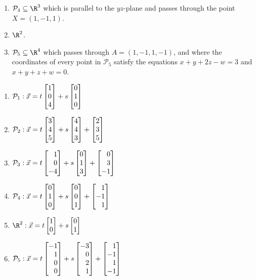 \begin{exercises}
\begin{problist}
\begin{enumerate}
			\item   $\mathcal P_4\subseteq\R^3$ which is parallel to the $yz$-plane and passes through the point $X=(1,-1,1)$.
			\item   $\R^2$.
			\item   $\mathcal P_5\subseteq\R^4$ which passes through $A=(1,-1,1,-1)$,
				and where the coordinates of every point in $\mathcal P_5$ satisfy the equations $x+y+2z-w=3$
				and $x+y+z+w=0$.
		\end{enumerate}
		\begin{solution}
			\begin{enumerate}
				\item $\mathcal{P}_1: \vec{x}=t\mat{1\\0\\4}+s\mat{0\\1\\0}$
				\item $\mathcal{P}_2: \vec{x}=t\mat{3\\4\\5}+s\mat{4\\4\\3}+\mat{2\\3\\5}$
				\item $\mathcal{P}_3: \vec{x}=t\mat{1\\0\\-4}+s\mat{0\\1\\3}+\mat{0\\3\\-1}$
				\item $\mathcal{P}_4: \vec{x}=t\mat{0\\1\\0}+s\mat{0\\0\\1}+\mat{1\\-1\\1}$
				\item $\R^2: \vec{x}=t\mat{1\\0}+s\mat{0\\1}$
				\item $\mathcal{P}_5: \vec{x}=t\mat{-1\\1\\0\\0}+s\mat{-3\\0\\2\\1}+\mat{1\\-1\\1\\-1}$

\end{enumerate}
\end{solution}
\end{problist}
\end{exercises}
